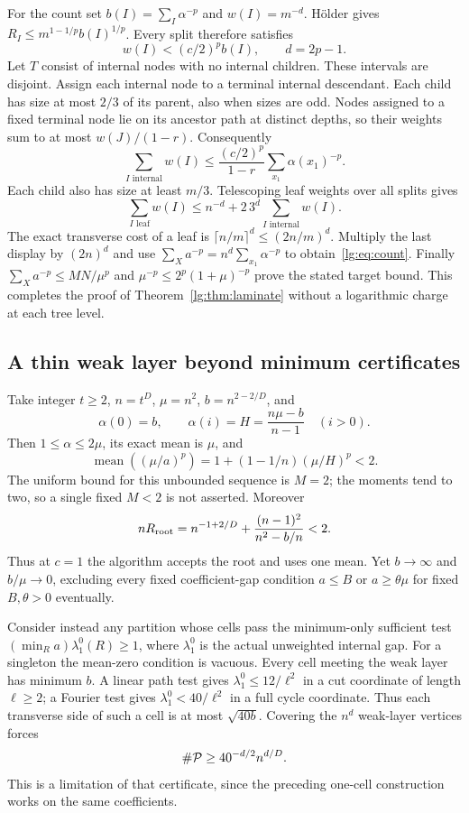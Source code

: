 For the count set $b(I)=\sum_I\alpha^{-p}$ and $w(I)=m^{-d}$.
H\"older gives $R_I\le m^{1-1/p}b(I)^{1/p}$. Every split therefore satisfies
\begin{equation}\label{lg:eq:charge}
 w(I)<(c/2)^p b(I),\qquad d=2p-1.
\end{equation}
Let $T$ consist of internal nodes with no internal children. These intervals
are disjoint. Assign each internal node to a terminal internal descendant.
Each child has size at most $2/3$ of its parent, also when sizes are odd.
Nodes assigned to a fixed terminal node lie on its ancestor path at distinct
depths, so their weights sum to at most $w(J)/(1-r)$. Consequently
\[
 \sum_{I\text{ internal}}w(I)
 \le\frac{(c/2)^p}{1-r}\sum_{x_1}\alpha(x_1)^{-p}.
\]
Each child also has size at least $m/3$. Telescoping leaf weights over all
splits gives
\[
 \sum_{I\text{ leaf}}w(I)
 \le n^{-d}+2\,3^d\sum_{I\text{ internal}}w(I).
\]
The exact transverse cost of a leaf is $\lceil n/m\rceil^d\le(2n/m)^d$.
Multiply the last display by $(2n)^d$ and use
$\sum_Xa^{-p}=n^d\sum_{x_1}\alpha^{-p}$ to obtain~\eqref{lg:eq:count}.
Finally $\sum_Xa^{-p}\le MN/\mu^p$ and
$\mu^{-p}\le2^p(1+\mu)^{-p}$ prove the stated target bound.
This completes the proof of Theorem~\ref{lg:thm:laminate} without a logarithmic
charge at each tree level.

\subsection{A thin weak layer beyond minimum certificates}
Take integer $t\ge2$, $n=t^D$, $\mu=n^2$, $b=n^{2-2/D}$, and
\[
 \alpha(0)=b,\qquad \alpha(i)=H=\frac{n\mu-b}{n-1}\quad(i>0).
\]
Then $1\le\alpha\le2\mu$, its exact mean is $\mu$, and
\begin{equation}\label{lg:eq:moment-layer}
 \operatorname{mean}((\mu/a)^p)
 =1+(1-1/n)(\mu/H)^p<2.
\end{equation}
The uniform bound for this unbounded sequence is $M=2$; the moments tend
to two, so a single fixed $M<2$ is not asserted. Moreover
\[
 nR_{\rm root}=n^{-1+2/D}
       +\frac{(n-1)^2}{n^2-b/n}<2.
\]
Thus at $c=1$ the algorithm accepts the root and uses one mean.
Yet $b\to\infty$ and $b/\mu\to0$, excluding every fixed coefficient-gap
condition $a\le B$ or $a\ge\theta\mu$ for fixed $B,\theta>0$ eventually.

Consider instead any partition whose cells pass the minimum-only sufficient
test $(\min_Ra)\lambda_1^0(R)\ge1$, where $\lambda_1^0$ is the actual
unweighted internal gap. For a singleton the mean-zero condition is vacuous.
Every cell meeting the weak layer has minimum $b$. A linear path test gives
$\lambda_1^0\le12/\ell^2$ in a cut coordinate of length $\ell\ge2$;
a Fourier test gives $\lambda_1^0<40/\ell^2$ in a full cycle coordinate.
Thus each transverse side of such a cell is at most $\sqrt{40b}$.
Covering the $n^d$ weak-layer vertices forces
\[
 \#\mathcal P\ge40^{-d/2}n^{d/D}.
\]
This is a limitation of that certificate, since the preceding one-cell
construction works on the same coefficients.

